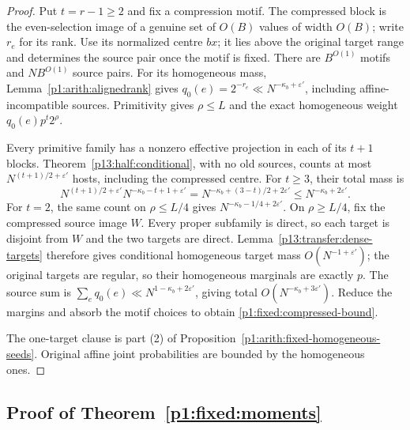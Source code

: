 \begin{proof}
Put $t=r-1\ge2$ and fix a compression motif. The compressed block
is the even-selection image of a genuine set of $O(B)$ values of
width $O(B)$; write $r_e$ for its rank.
Use its normalized centre $bx$; it lies above the original target
range and determines the source pair once the motif is fixed.
There are $B^{O(1)}$ motifs and $NB^{O(1)}$ source pairs.
For its homogeneous mass, Lemma~\ref{p1:arith:alignedrank} gives
$q_0(e)=2^{-r_e}\ll N^{-\kappa_b+\varepsilon'}$, including
affine-incompatible sources. Primitivity gives $\rho\le L$ and
the exact homogeneous weight $q_0(e)p^t2^\rho$.

Every primitive family has a nonzero effective projection in each
of its $t+1$ blocks. Theorem~\ref{p13:half:conditional}, with no old
sources, counts at most $N^{(t+1)/2+\varepsilon'}$ hosts,
including the compressed centre. For $t\ge3$, their total mass is
\[
 N^{(t+1)/2+\varepsilon'}N^{-\kappa_b-t+1+\varepsilon'}
   =N^{-\kappa_b+(3-t)/2+2\varepsilon'}
   \le N^{-\kappa_b+2\varepsilon'}.
\]
For $t=2$, the same count on $\rho\le L/4$ gives
$N^{-\kappa_b-1/4+2\varepsilon'}$.
On $\rho\ge L/4$, fix the compressed source image $W$.
Every proper subfamily is direct, so each target is disjoint from
$W$ and the two targets are direct. Lemma~\ref{p13:transfer:dense-targets}
therefore gives conditional homogeneous target mass
$O(N^{-1+\varepsilon'})$; the original targets are regular, so their
homogeneous marginals are exactly $p$.
The source sum is $\sum_e q_0(e)\ll N^{1-\kappa_b+2\varepsilon'}$,
giving total $O(N^{-\kappa_b+3\varepsilon'})$.
Reduce the margins and absorb the motif choices to obtain
\eqref{p1:fixed:compressed-bound}.

The one-target clause is part (2) of
Proposition~\ref{p1:arith:fixed-homogeneous-seeds}.
Original affine joint probabilities are bounded by the homogeneous ones.
\end{proof}

\subsection{Proof of Theorem~\ref{p1:fixed:moments}}
\label{p14:comp:fixed-moments}

